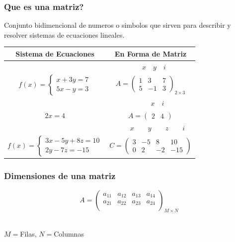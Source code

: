 \documentclass[stu, 12pt, letterpaper, donotrepeattitle, floatsintext, natbib]{apa7}
\begin{document}
    \subsubsection{Que es una matriz?}
    Conjunto bidimencional de numeros o simbolos que sirven para describir y resolver sistemas de ecuaciones lineales.
    \begin{table}
        \centering
        \begin{tabular}{|c|c|}
            \hline
            Sistema de Ecuaciones & En Forma de Matriz \\ \hline
            & $\quad x\quad y\quad i$ \\
            $ f(x) =  \begin{cases}
                          x + 3y = 7 \\ 5x - y = 3
            \end{cases} $
            &
            $A = \begin{pmatrix}
                     1 & 3  & 7 \\
                     5 & -1 & 3
            \end{pmatrix}_{2\times3}$ \\[1cm]\hline

            & $\quad\quad\quad x\quad i\quad $ \\
            $2x=4$ & $A = \begin{pmatrix}
                              2 & 4
            \end{pmatrix}$ \\[0.8cm]\hline

            & $\quad\quad x\quad\quad y\quad\quad z\quad\quad i$ \\
            $ f(x)=\begin{cases}
                       3x-5y+8z=10 \\ 2y-7z=-15
            \end{cases} $ &
            $C=\begin{pmatrix}
                   3 & -5 & 8  & 10  \\
                   0 & 2  & -2 & -15
            \end{pmatrix}$ \\[1cm]\hline
        \end{tabular}\label{tab:table}
    \end{table}

    \subsubsection{Dimensiones de una matriz}
    \[
        A=\begin{pmatrix}
              a_{11} & a_{12} & a_{13} & a_{14} \\
              a_{21} & a_{22} & a_{23} & a_{24} \\
        \end{pmatrix}_{M\times N}
    \]\\
    \begin{small}
        \begin{center}
            $M= $Filas, $N= $Columnas
        \end{center}
    \end{small}
\end{document}
